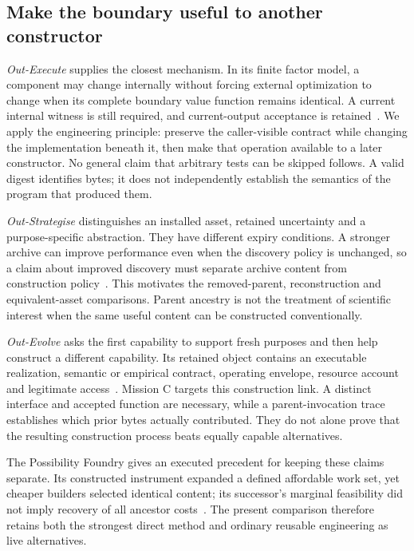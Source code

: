 \subsection{Make the boundary useful to another constructor}

\emph{Out-Execute} supplies the closest mechanism. In its finite factor model, a component may change internally without forcing external optimization to change when its complete boundary value function remains identical. A current internal witness is still required, and current-output acceptance is retained~\cite[PDF pp.~5--8, 11]{out_execute}. We apply the engineering principle: preserve the caller-visible contract while changing the implementation beneath it, then make that operation available to a later constructor. No general claim that arbitrary tests can be skipped follows. A valid digest identifies bytes; it does not independently establish the semantics of the program that produced them.

\emph{Out-Strategise} distinguishes an installed asset, retained uncertainty and a purpose-specific abstraction. They have different expiry conditions. A stronger archive can improve performance even when the discovery policy is unchanged, so a claim about improved discovery must separate archive content from construction policy~\cite[PDF pp.~12--14]{out_strategise}. This motivates the removed-parent, reconstruction and equivalent-asset comparisons. Parent ancestry is not the treatment of scientific interest when the same useful content can be constructed conventionally.

\emph{Out-Evolve} asks the first capability to support fresh purposes and then help construct a different capability. Its retained object contains an executable realization, semantic or empirical contract, operating envelope, resource account and legitimate access~\cite[PDF pp.~6--8, 14]{out_evolve}. Mission C targets this construction link. A distinct interface and accepted function are necessary, while a parent-invocation trace establishes which prior bytes actually contributed. They do not alone prove that the resulting construction process beats equally capable alternatives.

The Possibility Foundry gives an executed precedent for keeping these claims separate. Its constructed instrument expanded a defined affordable work set, yet cheaper builders selected identical content; its successor's marginal feasibility did not imply recovery of all ancestor costs~\cite[PDF pp.~2--4]{possibility_foundry}. The present comparison therefore retains both the strongest direct method and ordinary reusable engineering as live alternatives.

